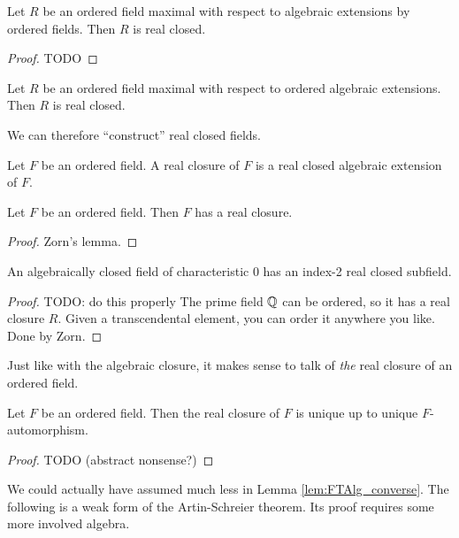 \begin{theorem}
  Let $R$ be an ordered field maximal with respect to algebraic extensions by ordered fields. Then $R$ is real closed.
\end{theorem}
\begin{proof}
  TODO
\end{proof}

\begin{corollary}
  Let $R$ be an ordered field maximal with respect to ordered algebraic extensions. Then $R$ is real closed.
\end{corollary}

We can therefore ``construct'' real closed fields.

\begin{definition}
  Let $F$ be an ordered field. A real closure of $F$ is a real closed algebraic extension of $F$.
\end{definition}

\begin{corollary}
  Let $F$ be an ordered field. Then $F$ has a real closure.
\end{corollary}
\begin{proof}
  Zorn's lemma.
\end{proof}

\begin{corollary}
  An algebraically closed field of characteristic 0 has an index-2 real closed subfield.
\end{corollary}
\begin{proof}
  TODO: do this properly
  The prime field $\mathbb{Q}$ can be ordered, so it has a real closure $R$. Given a transcendental element, you can order it anywhere you like. Done by Zorn.
\end{proof}

Just like with the algebraic closure, it makes sense to talk of \textit{the} real closure of an ordered field.

\begin{lemma}
  \label{lem:real_closure_unique}
  Let $F$ be an ordered field. Then the real closure of $F$ is unique up to unique $F$-automorphism.
\end{lemma}
\begin{proof}
  TODO (abstract nonsense?)
\end{proof}

We could actually have assumed much less in Lemma \ref{lem:FTAlg_converse}. The following is a weak form of the Artin-Schreier theorem. Its proof requires some more involved algebra.

